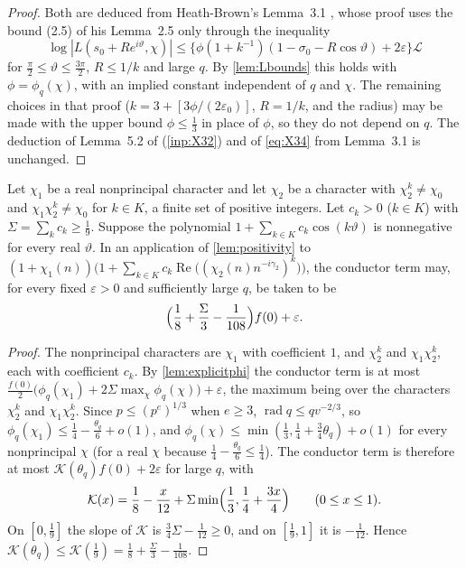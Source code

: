 \documentclass[11pt]{amsart}
\numberwithin{equation}{section}
\theoremstyle{plain}
\theoremstyle{definition}
\theoremstyle{remark}
\newcommand{\LL}{\mathcal{L}}
\renewcommand{\Re}{\operatorname{Re}}
\newcommand{\eps}{\varepsilon}
\newcommand{\1}{\mathbf{1}}
\begin{document}
\begin{proof}
Both are deduced from Heath-Brown's Lemma~3.1 \cite[pp.~12--14, 23--24]{HeathBrown1992zero}
\cite[pp.~19--21]{Xylouris2011nullstellen}, whose proof uses the bound (2.5) of his Lemma~2.5 only through
the inequality
\[
  \log|L(s_0+Re^{i\vartheta},\chi)|\le\bigl\{\phi(1+k^{-1})(1-\sigma_0-R\cos\vartheta)+2\eps\bigr\}\LL
\]
for $\frac\pi2\le\vartheta\le\frac{3\pi}2$, $R\le1/k$ and large $q$. By \cref{lem:Lbounds} this holds with
$\phi=\phi_q(\chi)$, with an implied constant independent of $q$ and $\chi$. The remaining choices in
that proof ($k=3+[3\phi/(2\eps_0)]$, $R=1/k$, and the radius) may be made with the upper bound
$\phi\le\frac13$ in place of $\phi$, so they do not depend on $q$. The deduction of Lemma~5.2 of
\cite{HeathBrown1992zero} (\cref{inp:X32}) and of \eqref{eq:X34} from Lemma~3.1 is unchanged.
\end{proof}

\begin{proposition}\label{prop:conductor}
Let $\chi_1$ be a real nonprincipal character and let $\chi_2$ be a character with $\chi_2^k\ne\chi_0$ and $\chi_1\chi_2^k\ne\chi_0$
for $k\in K$, a finite set of positive integers. Let $c_k>0$ ($k\in K$) with $\Sigma=\sum_kc_k\ge\frac19$.
Suppose the polynomial $1+\sum_{k\in K}c_k\cos(k\vartheta)$ is nonnegative for every real
$\vartheta$. In an application of \cref{lem:positivity} to
$(1+\chi_1(n))\bigl(1+\sum_{k\in K}c_k\Re\bigl((\chi_2(n)n^{-i\gamma_2})^k\bigr)\bigr)$,
the conductor term may, for every fixed $\eps>0$ and sufficiently large $q$, be taken to be
\[
  \Bigl(\frac18+\frac\Sigma3-\frac1{108}\Bigr)f(0)+\eps .
\]
\end{proposition}

\begin{proof}
The nonprincipal characters are $\chi_1$ with coefficient $1$, and $\chi_2^k$ and $\chi_1\chi_2^k$, each with
coefficient $c_k$. By \cref{lem:explicitphi} the conductor term is at most
$\frac{f(0)}2\bigl(\phi_q(\chi_1)+2\Sigma\max_\chi\phi_q(\chi)\bigr)+\eps$, the maximum being over the
characters $\chi_2^k$ and $\chi_1\chi_2^k$. Since $p\le(p^e)^{1/3}$ when $e\ge3$,
$\operatorname{rad}q\le qv^{-2/3}$, so $\phi_q(\chi_1)\le\frac14-\frac{\theta_q}6+o(1)$, and
$\phi_q(\chi)\le\min(\frac13,\frac14+\frac34\theta_q)+o(1)$ for every nonprincipal $\chi$ (for a real $\chi$
because $\frac14-\frac{\theta_q}6\le\frac14$).
The conductor term is therefore at most $\mathcal K(\theta_q)f(0)+2\eps$ for large $q$, with
\[
  \mathcal K(x)=\frac18-\frac x{12}+\Sigma\min\Bigl(\frac13,\frac14+\frac{3x}4\Bigr)\qquad(0\le x\le1).
\]
On $[0,\frac19]$ the slope of $\mathcal K$ is $\frac34\Sigma-\frac1{12}\ge0$, and on $[\frac19,1]$ it is
$-\frac1{12}$. Hence $\mathcal K(\theta_q)\le\mathcal K(\frac19)=\frac18+\frac\Sigma3-\frac1{108}$.
\end{proof}
\end{document}

